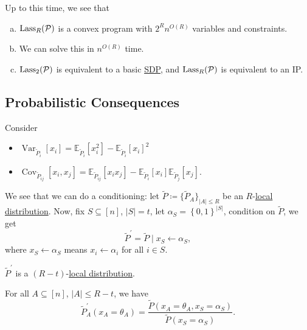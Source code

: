 Up to this time, we see that
\begin{enumerate}[(a)]
	\item \(\mathop{\mathrm{Lass}}_R(\mathcal{\MakeUppercase{p}})\) is a convex program with \(2^R n^{O(R)}\) variables and constraints.
	\item We can solve this in \(n^{O(R)}\) time.
	\item \(\mathop{\mathrm{Lass}}_2(\mathcal{\MakeUppercase{p}})\) is equivalent to a basic \hyperref[def:SDP]{SDP}, and \(\mathop{\mathrm{Lass}}_R(\mathcal{\MakeUppercase{p}})\) is equivalent to an IP.
\end{enumerate}

\subsection{Probabilistic Consequences}
Consider
\begin{itemize}
	\item \(\mathop{\mathrm{Var}}_{\widetilde{P} _i}\left[ x_i \right] = \mathbb{E}_{\widetilde{P} _i}\left[ x_i ^{2} \right] - \mathbb{E}_{\widetilde{P} _i}\left[ x_i \right]^{2}  \)
	\item \(\mathop{\mathrm{Cov}}_{\widetilde{P} _{ij}}\left[ x_i, x_j\right] = \mathbb{E}_{\widetilde{P} _{ij}}\left[ x_i x_j\right] - \mathbb{E}_{\widetilde{P} _{i}}\left[ x_i \right] \mathbb{E}_{\widetilde{P} _{j}}\left[ x_j\right]  \).
\end{itemize}
We see that we can do a conditioning: let \(\widetilde{P} \coloneqq \{ \widetilde{P} _{A} \} _{\left\vert A \right\vert \leq R}\) be an \(R\)-\hyperref[def:local-distribution]{local distribution}. Now, fix \(S \subseteq [n]\), \(\left\vert S \right\vert = t\), let \(\alpha _S = \left\{ 0, 1 \right\} ^{\left\vert S \right\vert }\), condition on \(\widetilde{P} \), we get
\[
	\widetilde{P} ^\prime = \widetilde{P} \mid x_S \gets \alpha _S,
\]
where \(x_S\gets \alpha _S\) means \(x_i \gets \alpha _i\) for all \(i\in S\).
\begin{remark}
	\(\widetilde{P} ^\prime \) is a \((R-t)\)-\hyperref[def:local-distribution]{local distribution}.
\end{remark}
\begin{explanation}
	For all \(A \subseteq [n]\), \(\left\vert A \right\vert \leq R-t\), we have
	\[
		\widetilde{P} ^\prime _A (x_A = \theta _A) = \frac{\widetilde{P} (x_A = \theta _A, x_S = \alpha _S)}{\widetilde{P} (x_S = \alpha _S)}.
	\]
\end{explanation}

